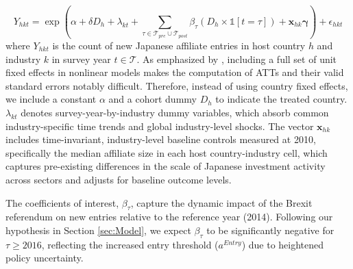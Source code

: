 \documentclass[preprint,11pt,authoryear]{elsarticle}
\begin{document}
\begin{equation}\label{eq:entry_ppml}
Y_{hkt} = \exp\left( \alpha + \delta D_h + \lambda_{kt} + \sum_{\tau \in \mathcal{T}_{pre} \cup \mathcal{T}_{post}} \beta_{\tau} (D_h \times \mathbb{1}[t=\tau]) + \mathbf{x}_{hk}\boldsymbol{\gamma} \right) + \epsilon_{hkt}
\end{equation}
where $Y_{hkt}$ is the count of new Japanese affiliate entries in host country $h$ and industry $k$ in survey year $t \in \mathcal{T}$. As emphasized by \citet{wooldridge2023simple}, including a full set of unit fixed effects in nonlinear models makes the computation of ATTs and their valid standard errors notably difficult. Therefore, instead of using country fixed effects, we include a constant $\alpha$ and a cohort dummy $D_h$ to indicate the treated country. $\lambda_{kt}$ denotes survey-year-by-industry dummy variables, which absorb common industry-specific time trends and global industry-level shocks. The vector $\mathbf{x}_{hk}$ includes time-invariant, industry-level baseline controls measured at 2010, specifically the median affiliate size in each host country-industry cell, which captures pre-existing differences in the scale of Japanese investment activity across sectors and adjusts for baseline outcome levels.

The coefficients of interest, $\beta_{\tau}$, capture the dynamic impact of the Brexit referendum on new entries relative to the reference year (2014). Following our hypothesis in Section \ref{sec:Model}, we expect $\beta_{\tau}$ to be significantly negative for $\tau \geq 2016$, reflecting the increased entry threshold ($a^{Entry}$) due to heightened policy uncertainty.
\end{document}
